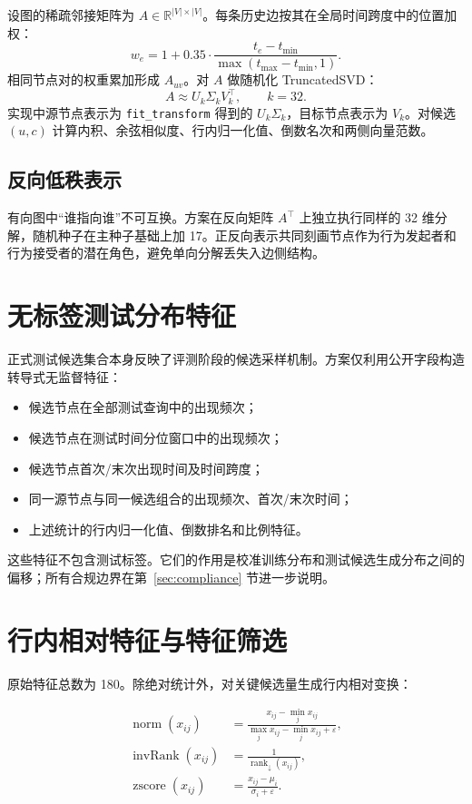 \documentclass[UTF8,a4paper,11pt]{ctexart}
\begin{document}
设图的稀疏邻接矩阵为 $A\in\mathbb{R}^{|V|\times|V|}$。每条历史边按其在全局时间跨度中的位置加权：
\[
w_e=1+0.35\cdot\frac{t_e-t_{\min}}{\max(t_{\max}-t_{\min},1)}.
\]
相同节点对的权重累加形成 $A_{uv}$。对 $A$ 做随机化 TruncatedSVD：
\[
A\approx U_k\Sigma_kV_k^{\top},\qquad k=32.
\]
实现中源节点表示为 \texttt{fit\_transform} 得到的 $U_k\Sigma_k$，目标节点表示为 $V_k$。对候选 $(u,c)$ 计算内积、余弦相似度、行内归一化值、倒数名次和两侧向量范数。

\subsection{反向低秩表示}

有向图中“谁指向谁”不可互换。方案在反向矩阵 $A^{\top}$ 上独立执行同样的 32 维分解，随机种子在主种子基础上加 17。正反向表示共同刻画节点作为行为发起者和行为接受者的潜在角色，避免单向分解丢失入边侧结构。

\section{无标签测试分布特征}

正式测试候选集合本身反映了评测阶段的候选采样机制。方案仅利用公开字段构造转导式无监督特征：

\begin{itemize}
  \item 候选节点在全部测试查询中的出现频次；
  \item 候选节点在测试时间分位窗口中的出现频次；
  \item 候选节点首次/末次出现时间及时间跨度；
  \item 同一源节点与同一候选组合的出现频次、首次/末次时间；
  \item 上述统计的行内归一化值、倒数排名和比例特征。
\end{itemize}

这些特征不包含测试标签。它们的作用是校准训练分布和测试候选生成分布之间的偏移；所有合规边界在第~\ref{sec:compliance} 节进一步说明。

\section{行内相对特征与特征筛选}

原始特征总数为 180。除绝对统计外，对关键候选量生成行内相对变换：

\begin{align*}
\operatorname{norm}(x_{ij})
&=\frac{x_{ij}-\min_j x_{ij}}{\max_j x_{ij}-\min_j x_{ij}+\varepsilon},\\
\operatorname{invRank}(x_{ij})
&=\frac{1}{\operatorname{rank}_{\downarrow}(x_{ij})},\\
\operatorname{zscore}(x_{ij})
&=\frac{x_{ij}-\mu_i}{\sigma_i+\varepsilon}.
\end{align*}
\end{document}

